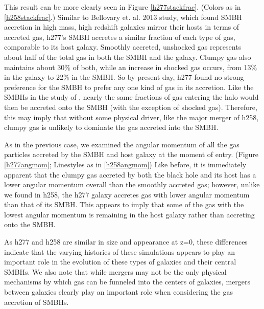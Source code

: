 \documentclass[12pt,headA,chapB]{fiskthesis}
\begin{document}
This result can be more clearly seen in Figure \ref{h277stackfrac}. (Colors as in \ref{h258stackfrac}.) Similar to Bellovary et. al. 2013 study, which found SMBH accretion in high mass, high redshift galaxies mirror their hosts in terms of accreted gas, h277's SMBH accretes a similar fraction of each type of gas, comparable to its host galaxy. Smoothly accreted, unshocked gas represents about half of the total gas in both the SMBH and the galaxy. Clumpy gas also maintains about 30\% of both, while an increase in shocked gas occurs, from 13\% in the galaxy to 22\% in the SMBH. %
So by present day, h277 found no strong preference for the SMBH to prefer any one kind of gas in its accretion. Like the SMBHs in the study of \cite{Bellovary2013}, nearly the same fractions of gas entering the halo would then be accreted onto the SMBH (with the exception of shocked gas). Therefore, this may imply that without some physical driver, like the major merger of h258, clumpy gas is unlikely to dominate the gas accreted into the SMBH.

As in the previous case, we examined the angular momentum of all the gas particles accreted by the SMBH and host galaxy at the moment of entry. (Figure \ref{h277angmom}; Linestyles as in \ref{h258angmom}) Like before, it is immediately apparent that the clumpy gas accreted by both the black hole and its host has a lower angular momentum overall than the smoothly accreted gas; however, unlike we found in h258, the h277 galaxy accretes gas with lower angular momentum than that of its SMBH. This appears to imply that some of the gas with the lowest angular momentum is remaining in the host galaxy rather than accreting onto the SMBH. 


As h277 and h258 are similar in size and appearance at z=0, these differences indicate that the varying histories of these simulations appears to play an important role in the evolution of these types of galaxies and their central SMBHs. We also note that while mergers may not be the only physical mechanisms by which gas can be funneled into the centers of galaxies, mergers between galaxies clearly play an important role when considering the gas accretion of SMBHs.
\end{document}
